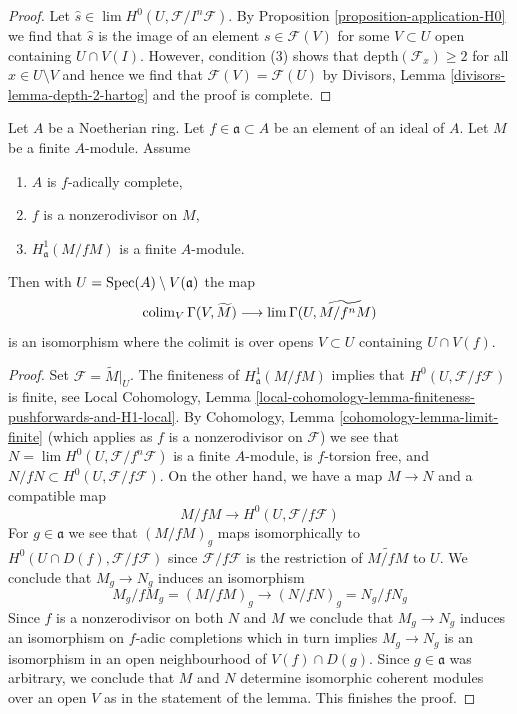 \begin{proof}
Let $\hat s \in \lim H^0(U, \mathcal{F}/I^n\mathcal{F})$.
By Proposition \ref{proposition-application-H0}
we find that $\hat s$ is the image of an element $s \in \mathcal{F}(V)$
for some $V \subset U$ open containing $U \cap V(I)$.
However, condition (3) shows that $\text{depth}(\mathcal{F}_x) \geq 2$
for all $x \in U \setminus V$ and hence we find that
$\mathcal{F}(V) = \mathcal{F}(U)$ by
Divisors, Lemma \ref{divisors-lemma-depth-2-hartog}
and the proof is complete.
\end{proof}

\begin{lemma}
\label{lemma-alternative-colim-H0}
Let $A$ be a Noetherian ring. Let $f \in \mathfrak a \subset A$
be an element of an ideal of $A$. Let $M$ be a finite $A$-module.
Assume
\begin{enumerate}
\item $A$ is $f$-adically complete,
\item $f$ is a nonzerodivisor on $M$,
\item $H^1_\mathfrak a(M/fM)$ is a finite $A$-module.
\end{enumerate}
Then with $U = \mathop{\mathrm{Spec}}(A) \setminus V(\mathfrak a)$ the map
$$
\mathop{\mathrm{colim}}\nolimits_V \Gamma(V, \widetilde{M})
\longrightarrow
\mathop{\mathrm{lim}}\nolimits \Gamma(U, \widetilde{M/f^nM})
$$
is an isomorphism where the colimit is over opens $V \subset U$
containing $U \cap V(f)$.
\end{lemma}

\begin{proof}
Set $\mathcal{F} = \widetilde{M}|_U$.
The finiteness of $H^1_\mathfrak a(M/fM)$ implies that
$H^0(U, \mathcal{F}/f\mathcal{F})$ is finite, see
Local Cohomology, Lemma
\ref{local-cohomology-lemma-finiteness-pushforwards-and-H1-local}.
By Cohomology, Lemma \ref{cohomology-lemma-limit-finite}
(which applies as $f$ is a nonzerodivisor on $\mathcal{F}$)
we see that $N = \lim H^0(U, \mathcal{F}/f^n\mathcal{F})$
is a finite $A$-module, is $f$-torsion free, and
$N/fN \subset H^0(U, \mathcal{F}/f\mathcal{F})$.
On the other hand, we have a map $M \to N$ and a compatible map
$$
M/fM \longrightarrow H^0(U, \mathcal{F}/f\mathcal{F})
$$
For $g \in \mathfrak a$ we see that $(M/fM)_g$ maps isomorphically
to $H^0(U \cap D(f), \mathcal{F}/f\mathcal{F})$ since
$\mathcal{F}/f\mathcal{F}$ is the restriction of $\widetilde{M/fM}$ to $U$.
We conclude that $M_g \to N_g$ induces an isomorphism
$$
M_g/fM_g = (M/fM)_g \to (N/fN)_g = N_g/fN_g
$$
Since $f$ is a nonzerodivisor on both $N$ and $M$ we conclude
that $M_g \to N_g$ induces an isomorphism on $f$-adic completions
which in turn implies $M_g \to N_g$ is an isomorphism in an open
neighbourhood of $V(f) \cap D(g)$.
Since $g \in \mathfrak a$ was arbitrary, we conclude that $M$ and $N$
determine isomorphic coherent modules over an open $V$
as in the statement of the lemma. This finishes the proof.
\end{proof}

